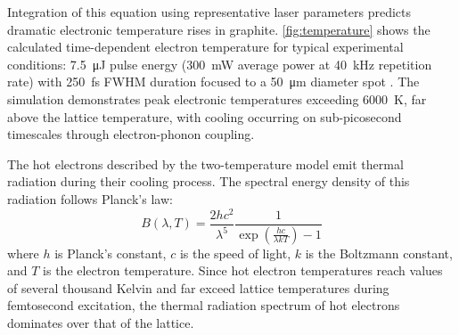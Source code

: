 \documentclass[
	parskip=half,
	a4paper,
]{scrarticle}
\begin{document}
Integration of this equation using representative laser parameters predicts dramatic electronic temperature rises in graphite. \autoref{fig:temperature} shows the calculated time-dependent electron temperature for typical experimental conditions: \SI{7.5}{\micro J} pulse energy (\SI{300}{mW} average power at \SI{40}{kHz} repetition rate) with \SI{250}{fs} FWHM duration focused to a \SI{50}{\micro m} diameter spot \cite{roob_thermal_2025}. The simulation demonstrates peak electronic temperatures exceeding \SI{6000}{K}, far above the lattice temperature, with cooling occurring on sub-picosecond timescales through electron-phonon coupling.

The hot electrons described by the two-temperature model emit thermal radiation during their cooling process. The spectral energy density of this radiation follows Planck's law:
\begin{equation}
B(\lambda, T) = \frac{2hc^2}{\lambda^5} \frac{1}{\exp\left(\frac{hc}{\lambda kT}\right) - 1}
\end{equation}
where $h$ is Planck's constant, $c$ is the speed of light, $k$ is the Boltzmann constant, and $T$ is the electron temperature. Since hot electron temperatures reach values of several thousand Kelvin and far exceed lattice temperatures during femtosecond excitation, the thermal radiation spectrum of hot electrons dominates over that of the lattice.
\end{document}
